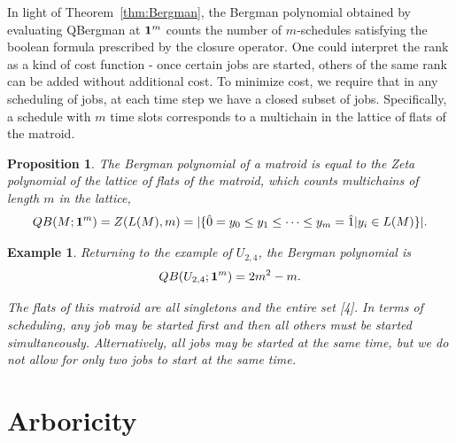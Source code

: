 \documentclass[12pt,reqno]{amsart}
\numberwithin{definition}{section}
\newtheorem{proposition}[definition]{Proposition}
\newtheorem{example}[definition]{Example}
\begin{document}





In light of Theorem~\ref{thm:Bergman}, the Bergman polynomial obtained
by evaluating QBergman at ${\bf 1}^m$ counts the number of
$m$-schedules satisfying the boolean formula prescribed by the closure
operator.  One could interpret the rank as a kind of cost function -
once certain jobs are started, others of the same rank can be added
without additional cost.  To minimize cost, we require that in any
scheduling of jobs, at each time step we have a closed subset of jobs.
Specifically, a schedule with $m$ time slots corresponds to a
multichain in the lattice of flats of the matroid.  

\begin{proposition}
The Bergman polynomial of a matroid is equal to the Zeta polynomial of the lattice of flats of the matroid, which counts multichains of length $m$ in the lattice,
$$QB(M;{\bf 1}^m) = Z(L(M),m) = |\{ \hat{0} = y_0 \leq y_1 \leq \cdots \leq y_m = \hat{1} | y_i \in L(M) \}|.$$

\end{proposition}



\begin{example}
Returning to the example of $U_{2,4}$, the Bergman polynomial is
$$QB(U_{2,4};{\bf 1}^m) = 2m^2 - m.$$

The flats of this matroid are all singletons and the entire set [4].  In terms of scheduling, any job may be started first and then all others must be started simultaneously.  Alternatively, all jobs may be started at the same time, but we do not allow for only two jobs to start at the same time. 
\end{example}



\section{Arboricity}

\end{document}
